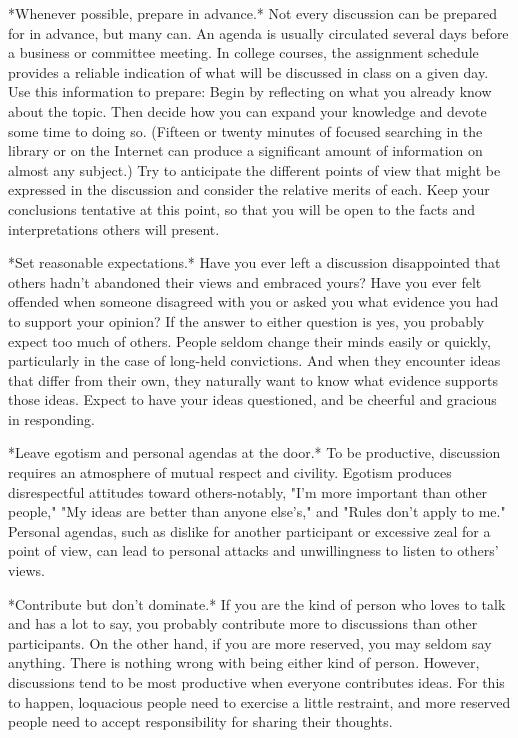 \documentclass{book}
\begin{document}
*Whenever possible, prepare in advance.* Not every discussion can be prepared for in advance, but many can. An agenda is usually circulated several days before a business or committee meeting. In college courses, the assignment schedule provides a reliable indication of what will be discussed in class on a given day. Use this information to prepare: Begin by reflecting on what you already know about the topic. Then decide how you can expand your knowledge and devote some time to doing so. (Fifteen or twenty minutes of focused searching in the library or on the Internet can produce a significant amount of information on almost any subject.) Try to anticipate the different points of view that might be expressed in the discussion and consider the relative merits of each. Keep your conclusions tentative at this point, so that you will be open to the facts and interpretations others will present.

*Set reasonable expectations.* Have you ever left a discussion disappointed that others hadn’t abandoned their views and embraced yours? Have you ever felt offended when someone disagreed with you or asked you what evidence you had to support your opinion? If the answer to either question is yes, you probably expect too much of others. People seldom change their minds easily or quickly, particularly in the case of long-held convictions. And when they encounter ideas that differ from their own, they naturally want to know what evidence supports those ideas. Expect to have your ideas questioned, and be cheerful and gracious in responding.

*Leave egotism and personal agendas at the door.* To be productive, discussion requires an atmosphere of mutual respect and civility. Egotism produces disrespectful attitudes toward others-notably, "I’m more important than other people," "My ideas are better than anyone else’s," and "Rules don’t apply to me." Personal agendas, such as dislike for another participant or excessive zeal for a point of view, can lead to personal attacks and unwillingness to listen to others’ views.

*Contribute but don’t dominate.* If you are the kind of person who loves to talk and has a lot to say, you probably contribute more to discussions than other participants. On the other hand, if you are more reserved, you may seldom say anything. There is nothing wrong with being either kind of person. However, discussions tend to be most productive when everyone contributes ideas. For this to happen, loquacious people need to exercise a little restraint, and more reserved people need to accept responsibility for sharing their thoughts.
\end{document}
